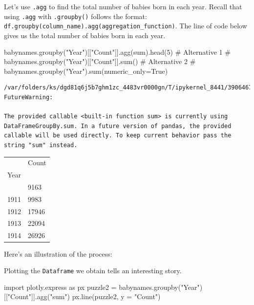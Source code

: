 \documentclass[
  letterpaper,
  DIV=11,
  numbers=noendperiod]{scrreprt}
\newenvironment{Shaded}{\begin{snugshade}}{\end{snugshade}}
\newcommand{\BuiltInTok}[1]{\textcolor[rgb]{0.00,0.23,0.31}{#1}}
\newcommand{\CommentTok}[1]{\textcolor[rgb]{0.37,0.37,0.37}{#1}}
\newcommand{\DecValTok}[1]{\textcolor[rgb]{0.68,0.00,0.00}{#1}}
\newcommand{\ImportTok}[1]{\textcolor[rgb]{0.00,0.46,0.62}{#1}}
\newcommand{\NormalTok}[1]{\textcolor[rgb]{0.00,0.23,0.31}{#1}}
\newcommand{\OperatorTok}[1]{\textcolor[rgb]{0.37,0.37,0.37}{#1}}
\newcommand{\StringTok}[1]{\textcolor[rgb]{0.13,0.47,0.30}{#1}}
\begin{document}
Let's use \texttt{.agg} to find the total number of babies born in each
year. Recall that using \texttt{.agg} with \texttt{.groupby()} follows
the format:
\texttt{df.groupby(column\_name).agg(aggregation\_function)}. The line
of code below gives us the total number of babies born in each year.

\begin{Shaded}
\begin{Highlighting}[]
\NormalTok{babynames.groupby(}\StringTok{"Year"}\NormalTok{)[[}\StringTok{"Count"}\NormalTok{]].agg(}\BuiltInTok{sum}\NormalTok{).head(}\DecValTok{5}\NormalTok{)}
\CommentTok{\# Alternative 1}
\CommentTok{\# babynames.groupby("Year")[["Count"]].sum()}
\CommentTok{\# Alternative 2}
\CommentTok{\# babynames.groupby("Year").sum(numeric\_only=True)}
\end{Highlighting}
\end{Shaded}

\begin{verbatim}
/var/folders/ks/dgd81q6j5b7ghm1zc_4483vr0000gn/T/ipykernel_8441/390646742.py:1: FutureWarning:

The provided callable <built-in function sum> is currently using DataFrameGroupBy.sum. In a future version of pandas, the provided callable will be used directly. To keep current behavior pass the string "sum" instead.
\end{verbatim}

\begin{longtable}[]{@{}ll@{}}
\toprule\noalign{}
& Count \\
Year & \\
\midrule\noalign{}
\endhead
\bottomrule\noalign{}
\endlastfoot
1910 & 9163 \\
1911 & 9983 \\
1912 & 17946 \\
1913 & 22094 \\
1914 & 26926 \\
\end{longtable}

Here's an illustration of the process:

Plotting the \texttt{Dataframe} we obtain tells an interesting story.

\begin{Shaded}
\begin{Highlighting}[]
\ImportTok{import}\NormalTok{ plotly.express }\ImportTok{as}\NormalTok{ px}
\NormalTok{puzzle2 }\OperatorTok{=}\NormalTok{ babynames.groupby(}\StringTok{"Year"}\NormalTok{)[[}\StringTok{"Count"}\NormalTok{]].agg(}\StringTok{"sum"}\NormalTok{)}
\NormalTok{px.line(puzzle2, y }\OperatorTok{=} \StringTok{"Count"}\NormalTok{)}
\end{Highlighting}
\end{Shaded}
\end{document}
